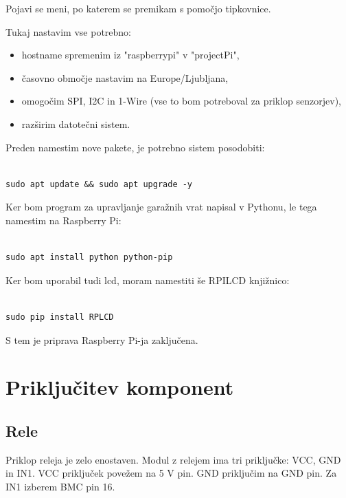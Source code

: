 \documentclass[11pt]{article}
\begin{document}
Pojavi se meni, po katerem se premikam s pomočjo tipkovnice.

Tukaj nastavim vse potrebno:
\begin{itemize}
    \item hostname spremenim iz "raspberrypi" v "projectPi",
    \item časovno območje nastavim na Europe/Ljubljana,
    \item omogočim SPI, I2C in 1-Wire (vse to bom potreboval za priklop senzorjev),
    \item razširim datotečni sistem.
\end{itemize}

Preden namestim nove pakete, je potrebno sistem posodobiti:

\begin{verbatim}

sudo apt update && sudo apt upgrade -y
\end{verbatim}

Ker bom program za upravljanje garažnih vrat napisal v Pythonu, le tega namestim na Raspberry Pi:
\begin{verbatim}

sudo apt install python python-pip
\end{verbatim}

Ker bom uporabil tudi \gls{lcd}, moram namestiti še RPILCD knjižnico:

\begin{verbatim}

sudo pip install RPLCD
\end{verbatim}

S tem je priprava Raspberry Pi-ja zaključena.

\section{Priključitev komponent}
\subsection{Rele}
Priklop releja je zelo enostaven. Modul z relejem ima tri priključke: VCC, GND in IN1. VCC priključek povežem na 5 V pin. GND priključim na GND pin. Za IN1 izberem BMC pin 16.
\end{document}
